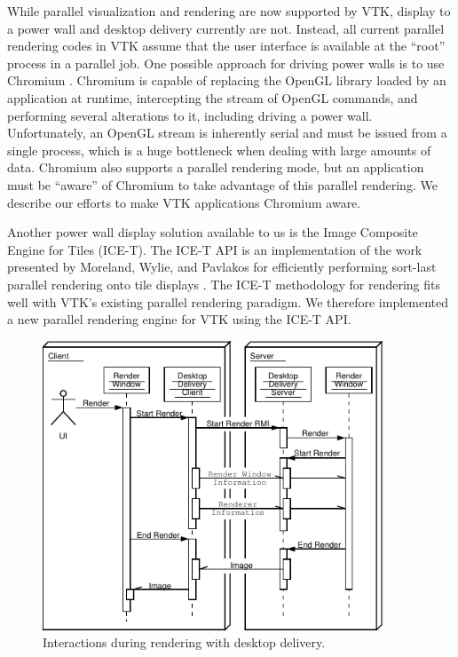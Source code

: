 \documentclass{acmsiggraph}
\begin{document}
  While parallel visualization and rendering are now supported by VTK,
  display to a power wall and desktop delivery currently are not.  Instead,
  all current parallel rendering codes in VTK assume that the user
  interface is available at the ``root'' process in a parallel job.  One
  possible approach for driving power walls is to use Chromium
  \cite{Humphreys02}.  Chromium is capable of replacing the OpenGL library
  loaded by an application at runtime, intercepting the stream of OpenGL
  commands, and performing several alterations to it, including driving a
  power wall.  Unfortunately, an OpenGL stream is inherently serial and
  must be issued from a single process, which is a huge bottleneck when
  dealing with large amounts of data.  Chromium also supports a parallel
  rendering mode, but an application must be ``aware'' of Chromium to take
  advantage of this parallel rendering.  We describe our efforts to make
  VTK applications Chromium aware.

  Another power wall display solution available to us is the Image
  Composite Engine for Tiles (ICE-T).  The ICE-T API is an implementation
  of the work presented by Moreland, Wylie, and Pavlakos for efficiently
  performing sort-last parallel rendering onto tile displays
  \cite{Moreland01}.  The ICE-T methodology for rendering fits well with
  VTK's existing parallel rendering paradigm.  We therefore implemented a
  new parallel rendering engine for VTK using the ICE-T API.


  \begin{figure}[ht]
    \begin{center}
      \includegraphics[width=4in]{images/DesktopDeliveryInteraction}
      \caption{Interactions during rendering with desktop delivery.}
      \label{fig:desktop_delivery_interaction}
    \end{center}
  \end{figure}
\end{document}
